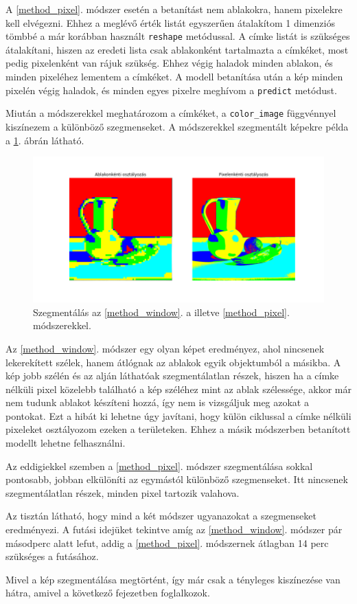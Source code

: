 A \ref{method_pixel}. módszer esetén a betanítást nem ablakokra, hanem pixelekre kell elvégezni. Ehhez a meglévő érték listát egyszerűen átalakítom 1 dimenziós tömbbé a már korábban használt \texttt{reshape} metódussal. A címke listát is szükséges átalakítani, hiszen az eredeti lista csak ablakonként tartalmazta a címkéket, most pedig pixelenként van rájuk szükség. Ehhez végig haladok minden ablakon, és minden pixeléhez lementem a címkéket. A modell betanítása után a kép minden pixelén végig haladok, és minden egyes pixelre meghívom a \texttt{predict} metódust.

Miután a módszerekkel meghatározom a címkéket, a \texttt{color\_image} függvénnyel kiszínezem a különböző szegmenseket. A módszerekkel szegmentált képekre példa a \ref{fig:window_pixel_segmentation}. ábrán látható.

\begin{figure}[h]
\centering
\includegraphics[scale=0.5]{images/window_pixel_segmentation.png}
\caption{Szegmentálás az \ref{method_window}. a illetve \ref{method_pixel}. módszerekkel.}
\label{fig:window_pixel_segmentation}
\end{figure}

Az \ref{method_window}. módszer egy olyan képet eredményez, ahol nincsenek lekerekített szélek, hanem átlógnak az ablakok egyik objektumból a másikba. A kép jobb szélén és az alján láthatóak szegmentálatlan részek, hiszen ha a címke nélküli pixel közelebb található a kép széléhez mint az ablak szélessége, akkor már nem tudunk ablakot készíteni hozzá, így nem is vizsgáljuk meg azokat a pontokat. Ezt a hibát ki lehetne úgy javítani, hogy külön ciklussal a címke nélküli pixeleket osztályozom ezeken a területeken. Ehhez a másik módszerben betanított modellt lehetne felhasználni.

Az eddigiekkel szemben a \ref{method_pixel}. módszer szegmentálása sokkal pontosabb, jobban elkülöníti az egymástól különböző szegmenseket. Itt nincsenek szegmentálatlan részek, minden pixel tartozik valahova.

Az tisztán látható, hogy mind a két módszer ugyanazokat a szegmenseket eredményezi. A futási idejüket tekintve amíg az \ref{method_window}. módszer pár másodperc alatt lefut, addig a \ref{method_pixel}. módszernek átlagban 14 perc szükséges a futásához.

Mivel a kép szegmentálása megtörtént, így már csak a tényleges kiszínezése van hátra, amivel a következő fejezetben foglalkozok. 